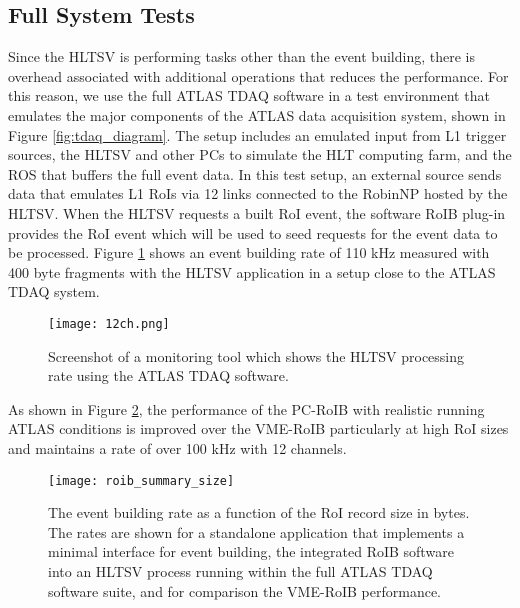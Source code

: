 \subsection{Full System Tests}\label{sec:perf_tdaq}

Since the HLTSV is performing tasks other than the event building, there is overhead associated with additional operations 
that reduces the performance. For this reason, we use the full ATLAS TDAQ software in a test environment that emulates the major components of the ATLAS data acquisition system, shown in Figure \ref{fig:tdaq_diagram}. The setup includes an emulated input from L1 trigger sources, 
the HLTSV and other PCs to simulate the HLT computing farm, and the ROS that buffers the full event data. 
 In this test setup, an external source sends data that emulates L1 RoIs via 12 links connected to the 
RobinNP hosted by the HLTSV. When the HLTSV requests a built RoI event, the software RoIB plug-in provides the RoI event which will be used 
to seed requests for the event data to be processed.
 Figure \ref{fig:partition} shows an event building rate of 110 kHz measured with 400 byte fragments with the HLTSV application in a setup close to the ATLAS TDAQ system. 

\begin{figure}[tbp] %
\centering
\texttt{[image: 12ch.png]}
\caption{Screenshot of a monitoring tool which shows the HLTSV processing rate using the ATLAS TDAQ software.}
\label{fig:partition}
\end{figure}

As shown in Figure \ref{fig:roib_summary}, the performance of the PC-RoIB with realistic running ATLAS conditions is improved over the VME-RoIB particularly at high RoI sizes and maintains a rate of over 100 kHz with 12 channels. 

\begin{figure}[t!]
\centering
\texttt{[image: roib\_summary\_size]} 
\caption{The event building rate as a function of the RoI record size in bytes. The rates are shown for a standalone application that implements 
  a minimal interface for event building, the integrated RoIB software into an HLTSV process running within the full ATLAS TDAQ software suite, and for comparison the VME-RoIB performance.}
\label{fig:roib_summary}
\end{figure} 

